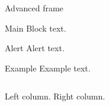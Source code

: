\documentclass[aspectratio=169]{beamer}
\begin{document}
\begin{frame}[t]{Advanced frame}
\begin{block}{Main}
Block text.
\end{block}
\begin{alertblock}{Alert}
Alert text.
\end{alertblock}
\begin{exampleblock}{Example}
Example text.
\end{exampleblock}
\begin{columns}[T]
Left column.
Right column.
\end{columns}
\end{frame}
\end{document}
